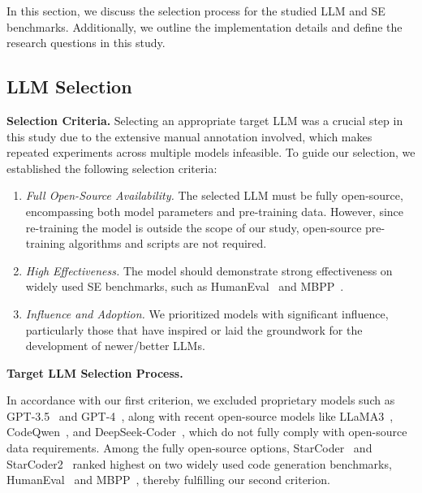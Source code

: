 In this section, we discuss the selection process for the studied LLM and SE benchmarks. Additionally, we outline the implementation details and define the research questions in this study.

\vspace{-0.2cm}
\subsection{LLM Selection} 
\label{llm_selection}

 



 \textbf{Selection Criteria.} Selecting an appropriate target LLM was a crucial step in this study due to the extensive manual annotation involved, which makes repeated experiments across multiple models infeasible. To guide our selection, we established the following selection criteria:
 

\noindent
\begin{enumerate}[left=0pt]
    \item \textit{Full Open-Source Availability.} The selected LLM must be fully open-source, encompassing both model parameters and pre-training data. However, since re-training the model is outside the scope of our study, open-source pre-training algorithms and scripts are not required.
    \item \textit{High Effectiveness.} The model should demonstrate strong effectiveness on widely used SE benchmarks, such as HumanEval~\cite{chen2021evaluating} and MBPP~\cite{MBPP_1}.
    \item \textit{Influence and Adoption.} 
We prioritized models with significant influence, particularly those that have inspired or laid the groundwork for the development of newer/better LLMs.
\end{enumerate}



\vspace{0.1cm}
\noindent
 \textbf{Target LLM Selection Process.}


In accordance with our first criterion, we excluded proprietary models such as GPT-3.5~\cite{gpt-3.5-turbo} and GPT-4~\cite{gpt4}, along with recent open-source models like LLaMA3~\cite{llama3}, CodeQwen~\cite{codeqwen}, and DeepSeek-Coder~\cite{deepseekcoder}, which do not fully comply with open-source data requirements. Among the fully open-source options, StarCoder~\cite{starcoder_one} and StarCoder2~\cite{starcoder2} ranked highest on two widely used code generation benchmarks, HumanEval~\cite{chen2021evaluating} and MBPP~\cite{MBPP_1}, thereby fulfilling our second criterion.



